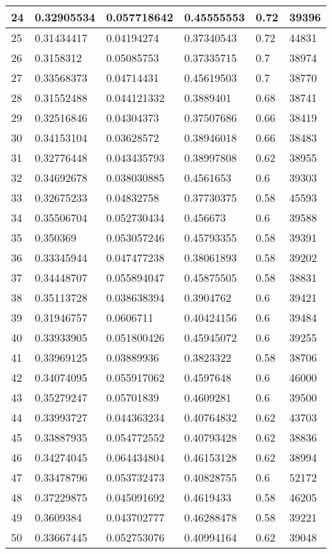 \begin{longtable}{|l|l|l|l|l|l|}
24 & 0.32905534 & 0.057718642 & 0.45555553 & 0.72 & 39396 \\ \hline 
25 & 0.31434417 & 0.04194274 & 0.37340543 & 0.72 & 44831 \\ \hline 
26 & 0.3158312 & 0.05085753 & 0.37335715 & 0.7 & 38974 \\ \hline 
27 & 0.33568373 & 0.04714431 & 0.45619503 & 0.7 & 38770 \\ \hline 
28 & 0.31552488 & 0.044121332 & 0.3889401 & 0.68 & 38741 \\ \hline 
29 & 0.32516846 & 0.04304373 & 0.37507686 & 0.66 & 38419 \\ \hline 
30 & 0.34153104 & 0.03628572 & 0.38946018 & 0.66 & 38483 \\ \hline 
31 & 0.32776448 & 0.043435793 & 0.38997808 & 0.62 & 38955 \\ \hline 
32 & 0.34692678 & 0.038030885 & 0.4561653 & 0.6 & 39303 \\ \hline 
33 & 0.32675233 & 0.04832758 & 0.37730375 & 0.58 & 45593 \\ \hline 
34 & 0.35506704 & 0.052730434 & 0.456673 & 0.6 & 39588 \\ \hline 
35 & 0.350369 & 0.053057246 & 0.45793355 & 0.58 & 39391 \\ \hline 
36 & 0.33345944 & 0.047477238 & 0.38061893 & 0.58 & 39202 \\ \hline 
37 & 0.34448707 & 0.055894047 & 0.45875505 & 0.58 & 38831 \\ \hline 
38 & 0.35113728 & 0.038638394 & 0.3904762 & 0.6 & 39421 \\ \hline 
39 & 0.31946757 & 0.0606711 & 0.40424156 & 0.6 & 39484 \\ \hline 
40 & 0.33933905 & 0.051800426 & 0.45945072 & 0.6 & 39255 \\ \hline 
41 & 0.33969125 & 0.03889936 & 0.3823322 & 0.58 & 38706 \\ \hline 
42 & 0.34074095 & 0.055917062 & 0.4597648 & 0.6 & 46000 \\ \hline 
43 & 0.35279247 & 0.05701839 & 0.4609281 & 0.6 & 39500 \\ \hline 
44 & 0.33993727 & 0.044363234 & 0.40764832 & 0.62 & 43703 \\ \hline 
45 & 0.33887935 & 0.054772552 & 0.40793428 & 0.62 & 38836 \\ \hline 
46 & 0.34274045 & 0.064434804 & 0.46153128 & 0.62 & 38994 \\ \hline 
47 & 0.33478796 & 0.053732473 & 0.40828755 & 0.6 & 52172 \\ \hline 
48 & 0.37229875 & 0.045091692 & 0.4619433 & 0.58 & 46205 \\ \hline 
49 & 0.3609384 & 0.043702777 & 0.46288478 & 0.58 & 39221 \\ \hline 
50 & 0.33667445 & 0.052753076 & 0.40994164 & 0.62 & 39048 \\ \hline 
\end{longtable}